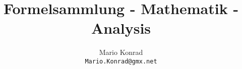 \documentclass[10pt,a4paper,oneside]{article}
\begin{document}
\title{Formelsammlung - Mathematik - Analysis}
\author{Mario Konrad\\\texttt{Mario.Konrad@gmx.net}}
\maketitle
\tableofcontents

\end{document}
